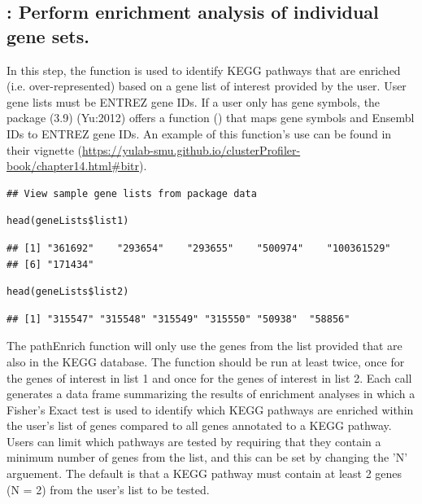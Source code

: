 \documentclass[article]{jss}\usepackage[]{graphicx}\usepackage[]{color}
\makeatletter
\newenvironment{kframe}{%
 \def\at@end@of@kframe{}%
 \ifinner\ifhmode%
  \def\at@end@of@kframe{\end{minipage}}%
  \begin{minipage}{\columnwidth}%
 \fi\fi%
 \def\FrameCommand##1{\hskip\@totalleftmargin \hskip-\fboxsep
 \colorbox{shadecolor}{##1}\hskip-\fboxsep
     \hskip-\linewidth \hskip-\@totalleftmargin \hskip\columnwidth}%
 \MakeFramed {\advance\hsize-\width
   \@totalleftmargin\z@ \linewidth\hsize
   \@setminipage}}%
 {\par\unskip\endMakeFramed%
 \at@end@of@kframe}
\newenvironment{knitrout}{}{} %
\makeatother
\begin{document}
\subsection{: Perform enrichment analysis of individual gene sets.}

In this step, the  function is used to identify KEGG pathways
that are enriched (i.e. over-represented) based on a gene list of interest
provided by the user. User gene lists must be ENTREZ gene IDs. If a user only
has gene symbols, the  package (3.9) (Yu:2012) offers a
function () that maps gene symbols and Ensembl IDs to ENTREZ gene
IDs. An example of this function's use can be found in their vignette
(\url{https://yulab-smu.github.io/clusterProfiler-book/chapter14.html#bitr}).

\begin{knitrout}
\color{fgcolor}\begin{kframe}
\begin{lstlisting}[basicstyle=\ttfamily,breaklines=true]
## View sample gene lists from package data\end{lstlisting}
\begin{lstlisting}[basicstyle=\ttfamily,breaklines=true]
head(geneLists$list1)\end{lstlisting}
\begin{lstlisting}[basicstyle=\ttfamily,breaklines=true]
## [1] "361692"    "293654"    "293655"    "500974"    "100361529"
## [6] "171434"
\end{lstlisting}
\begin{lstlisting}[basicstyle=\ttfamily,breaklines=true]
head(geneLists$list2)\end{lstlisting}
\begin{lstlisting}[basicstyle=\ttfamily,breaklines=true]
## [1] "315547" "315548" "315549" "315550" "50938"  "58856"
\end{lstlisting}
\end{kframe}
\end{knitrout}

The pathEnrich function will only use the genes from the list provided that are
also in the KEGG database. The  function should be run at least
twice, once for the genes of interest in list 1 and once for the genes of
interest in list 2. Each  call generates a data frame
summarizing the results of enrichment analyses in which a Fisher’s Exact test is
used to identify which KEGG pathways are enriched within the user’s list of
genes compared to all genes annotated to a KEGG pathway. Users can limit which
pathways are tested by requiring that they contain a minimum number of genes
from the list, and this can be set by changing the 'N' arguement. The default is
that a KEGG pathway must contain at least 2 genes (N = 2) from the user’s list
to be tested.
\end{document}
